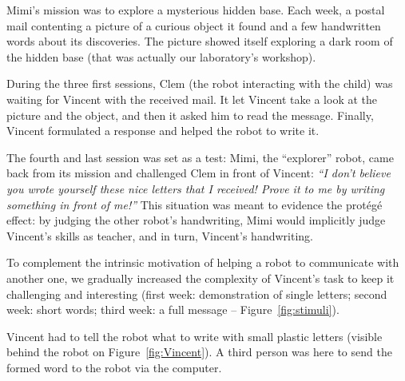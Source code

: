 \documentclass{sig-alternate}
\begin{document}
Mimi's mission was to explore a mysterious hidden
base. Each week, a postal mail contenting
a picture of a curious object it found and a few handwritten words about its discoveries. 
The picture showed itself exploring 
a dark room of the hidden base (that was actually our laboratory's workshop). 

During the three first sessions, Clem (the robot interacting with the child) was waiting for Vincent
with the received mail. It let Vincent take a look at the picture and the object,
and then it asked him to read the message.
Finally, Vincent formulated a response and helped the robot to write it.

The fourth and last session was set as a test: Mimi, the ``explorer'' robot,
came back from its mission and challenged Clem in
front of Vincent: \emph{``I don't believe you wrote yourself these nice letters that I
received! Prove it to me by writing something in front of me!''} This situation
was meant to evidence the prot\'eg\'e effect: by judging the other robot's
handwriting, Mimi would implicitly judge Vincent's skills as
teacher, and in turn, Vincent's handwriting.

To complement the intrinsic motivation of helping a robot to communicate with another one, we
gradually increased the complexity of Vincent's task to keep it challenging and
interesting (first week: demonstration of single letters; second week:
short words; third week: a full message -- Figure~\ref{fig:stimuli}).

Vincent had to tell the robot what to write with small plastic letters (visible
behind the robot on Figure~\ref{fig:Vincent}). A third person was here to send
the formed word to the robot via the computer.

\end{document}
